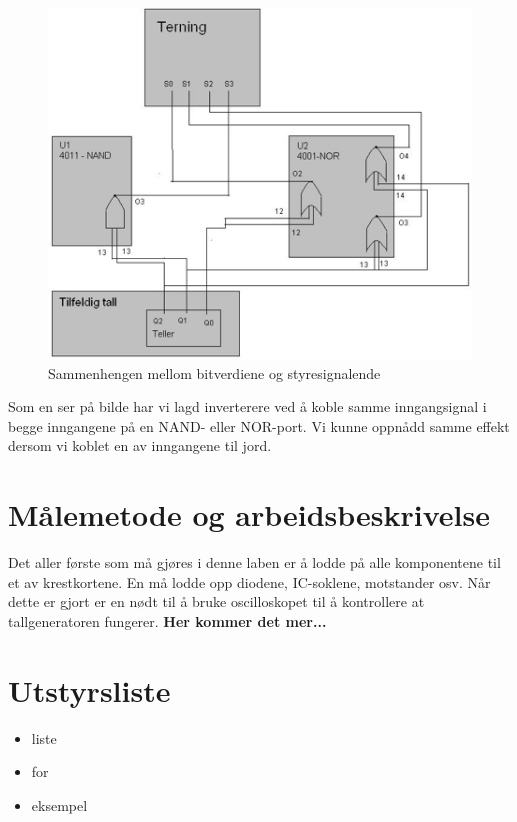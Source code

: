 \documentclass[12pt,norsk,a4paper]{article}
\begin{document}
    \begin{figure}[H]
    \includegraphics[scale=0.75]{Krestkortet.png}
    \caption{Sammenhengen mellom bitverdiene og styresignalende}
    \label{fig:kretskortet}
    \end{figure}

    Som en ser på bilde har vi lagd inverterere ved å koble samme inngangsignal i begge inngangene på en NAND- eller NOR-port. Vi kunne oppnådd samme effekt dersom vi koblet en av inngangene til jord.    

\clearpage

\section{Målemetode og arbeidsbeskrivelse}
Det aller første som må gjøres i denne laben er å lodde på alle komponentene til et av krestkortene. En må lodde opp diodene, IC-soklene, motstander osv. Når dette er gjort er en nødt til å bruke oscilloskopet til å kontrollere at tallgeneratoren fungerer.
\textbf{Her kommer det mer...}
\clearpage


\section{Utstyrsliste} 
    \begin{itemize} %
    \item liste     %
    \item for
    \item eksempel
    \end{itemize}
\clearpage
\end{document}
